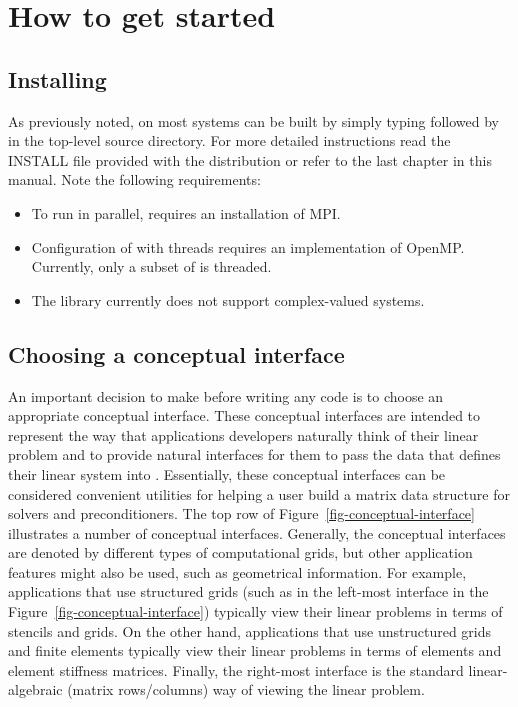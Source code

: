 \section{How to get started}



\subsection{Installing \hypre{}}

As previously noted, on most systems \hypre{} can be built by simply
typing  followed by  in the top-level
source directory. For more detailed instructions read the INSTALL file
provided with the \hypre{} distribution or refer to the last chapter
in this manual. Note the following requirements:


\begin{itemize}

\item To run in parallel, \hypre{} requires an installation of MPI.

\item Configuration of \hypre{} with threads requires an implementation
of OpenMP.  Currently, only a subset of \hypre{} is threaded.

\item The \hypre{} library currently does not support complex-valued systems.

\end{itemize}

\subsection{Choosing a conceptual interface}


An important decision to make before writing any code is to choose an
appropriate conceptual interface.  These conceptual interfaces are
intended to represent the way that applications developers naturally
think of their linear problem and to provide natural interfaces for them
to pass the data that defines their linear system into \hypre{}.
Essentially, these conceptual interfaces can be considered convenient
utilities for helping a user build a matrix data structure for
\hypre{} solvers and preconditioners.  The top row of
Figure~\ref{fig-conceptual-interface} illustrates a number of
conceptual interfaces.  Generally, the conceptual interfaces are
denoted by different types of computational grids, but other
application features might also be used, such as geometrical
information.  For example, applications that use structured grids
(such as in the left-most interface in the
Figure~\ref{fig-conceptual-interface}) typically view their linear
problems in terms of stencils and grids.  On the other hand,
applications that use unstructured grids and finite elements typically
view their linear problems in terms of elements and element stiffness
matrices. Finally, the right-most interface is the standard
linear-algebraic (matrix rows/columns) way of viewing the linear
problem.

